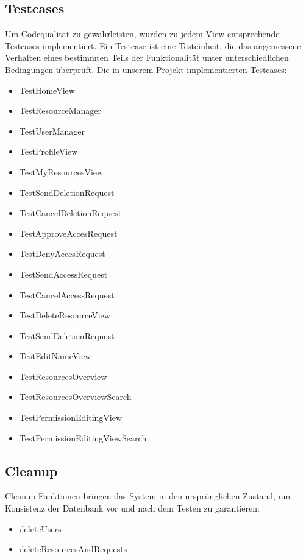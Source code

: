 \documentclass[parskip=full,11pt]{scrartcl}
\begin{document}
\subsection*{Testcases}
Um Codequalität zu gewährleisten, wurden zu jedem View entsprechende Testcases implementiert. Ein Testcase ist eine Testeinheit, die das angemessene Verhalten eines bestimmten Teils der Funktionalität unter unterschiedlichen Bedingungen überprüft. Die in unserem Projekt implementierten Testcases:  
\begin{itemize}
\item TestHomeView
\item TestResourceManager
\item TestUserManager
\item TestProfileView
\item TestMyResourcesView
\item TestSendDeletionRequest
\item TestCancelDeletionRequest
\item TestApproveAccesRequest
\item TestDenyAccesRequest
\item TestSendAccessRequest
\item TestCancelAccessRequest
\item TestDeleteResourceView
\item TestSendDeletionRequest
\item TestEditNameView
\item TestResourcesOverview
\item TestResourcesOverviewSearch
\item TestPermissionEditingView
\item TestPermissionEditingViewSearch

\end{itemize}
\subsection*{Cleanup}
Cleanup-Funktionen bringen das System in den ursprünglichen Zustand, um Konsistenz der Datenbank vor und nach dem Testen zu garantieren:  
\begin{itemize}
\item deleteUsers
\item deleteResourcesAndRequests
\end{itemize}

\newpage
\end{document}
